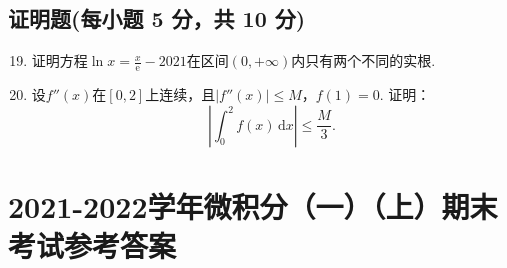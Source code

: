 \documentclass[../Main.tex]{subfiles}
\begin{document}
\section{证明题(每小题 5 分，共 10 分)}
\begin{enumerate}
    \setcounter{enumi}{18}
    \item 证明方程$\ln x = \frac{x}{\mathrm{e}}-2021$在区间$(0,+\infty)$内只有两个不同的实根.
          \vspace{14em}

    \item 设$f''(x)$在$[0,2]$上连续，且$|f''(x)|\leq M$，$f(1)=0$. 证明：
          \[
              \left|\int_{0}^{2}f(x)\,\mathrm{d}x\right|\leq\frac{M}{3}.
          \]
          \vspace{14em}
\end{enumerate}

\chapter{2021-2022学年微积分（一）（上）期末考试参考答案}
\end{document}
